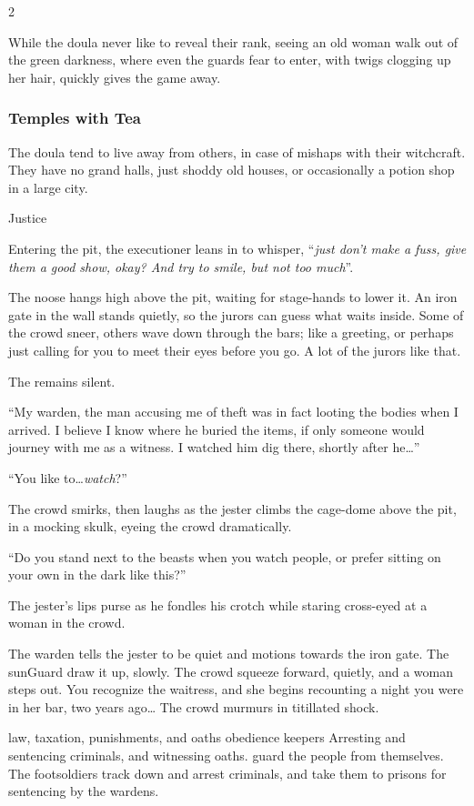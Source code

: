 \begin{multicols}{2}
\begin{description}
  While the \gls{doula} never like to reveal their rank, seeing an old woman walk out of the green darkness, where even the \glspl{guard} fear to enter, with twigs clogging up her hair, quickly gives the game away.
\end{description}

\subsubsection{Temples with Tea}
The \gls{doula} tend to live away from others, in case of mishaps with their \gls{witchcraft}.
They have no grand halls, just shoddy old houses, or occasionally a potion shop in a large city.

  {Justice}%
  {
    Entering the pit, the executioner leans in to whisper, ``\textit{just don't make a fuss, give them a good show, okay?
    And try to smile, but not too much}''.

    The noose hangs high above the pit, waiting for stage-hands to lower it.
    An iron gate in the wall stands quietly, so the jurors can guess what waits inside.
    Some of the crowd sneer, others wave down through the bars; like a greeting, or perhaps just calling for you to meet their eyes before you go.
    A lot of the jurors like that.

    The  remains silent.

    \begin{speechtext}
      ``My \gls{warden}, the man accusing me of theft was in fact looting the bodies when I arrived.
      I believe I know where he buried the items, if only someone would journey with me as a witness.
      I watched him dig there, shortly after he\ldots''
    \end{speechtext}

    {\sffamily ``You like to\ldots\emph{watch}?''}

    The crowd smirks, then laughs as the jester climbs the cage-dome above the pit, in a mocking skulk, eyeing the crowd dramatically.

    {\sffamily ``Do you stand next to the beasts when you watch people, or prefer sitting on your own in the dark like this?''}

    The jester's lips purse as he fondles his crotch while staring cross-eyed at a woman in the crowd.

    The \gls{warden} tells the jester to be quiet and motions towards the iron gate.
    The \gls{sunGuard} draw it up, slowly.
    The crowd squeeze forward, quietly, and a woman steps out.
    You recognize the waitress, and she begins recounting a night you were in her bar, two years ago\ldots
    The crowd murmurs in titillated shock.
  }%
  {law, taxation, punishments, and oaths}%
  {obedience}%
  {\Glspl{keeper}}%
  {
    Arresting and sentencing criminals, and witnessing oaths.
  }%
guard the people from themselves.
The footsoldiers track down and arrest criminals, and take them to prisons for sentencing by the \glspl{warden}.


\end{multicols}
